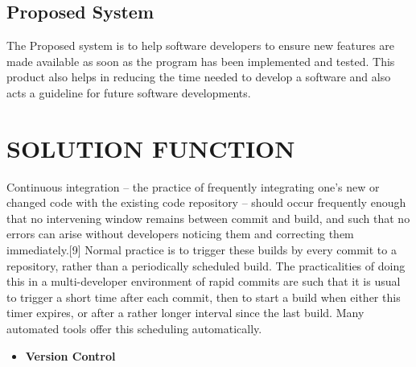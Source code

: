 \documentclass[12pt,a4paper,oneside]{report}
\begin{document}
{\subsection{Proposed System}
\par 
The Proposed system is to help software developers to ensure new features are made
available as soon as the program has been implemented and tested. This product also helps in
reducing the time needed to develop a software and also acts a guideline for future software
developments.
\section{SOLUTION FUNCTION}

\par Continuous integration – the practice of frequently integrating one's new or changed code with the existing code repository – should occur frequently enough that no intervening window remains between commit and build, and such that no errors can arise without developers noticing them and correcting them immediately.[9] Normal practice is to trigger these builds by every commit to a repository, rather than a periodically scheduled build. The practicalities of doing this in a multi-developer environment of rapid commits are such that it is usual to trigger a short time after each commit, then to start a build when either this timer expires, or after a rather longer interval since the last build. Many automated tools offer this scheduling automatically.

\begin{itemize}
\item \textbf{Version Control}


\end{itemize}}
\end{document}
